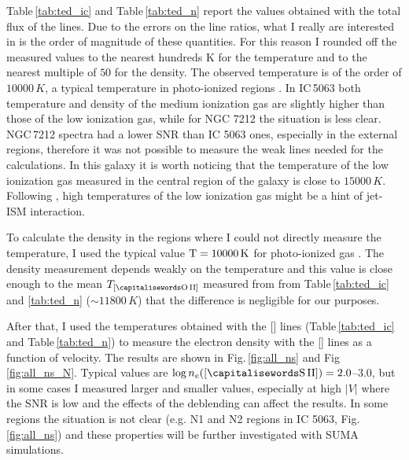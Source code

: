\documentclass[../main.tex]{subfiles}
\begin{document}
Table\,\ref{tab:ted_ic} and Table\,\ref{tab:ted_n} report the values obtained with the total flux of the lines.
Due to the errors on the line ratios, what I really are interested in is the order of magnitude of these quantities.
For this reason I rounded off the measured values to the nearest hundreds K for the temperature and to the nearest multiple of $50$ for the density.
The observed temperature is of the order of $10000\,\si{K}$, a typical temperature in photo-ionized regions \citep{OsterbrockAGN}.
In IC\,5063 both temperature and density of the medium ionization gas are slightly higher than those of the low ionization gas, while for NGC 7212 the situation is less clear.
NGC\,7212 spectra had a lower SNR than IC 5063 ones, especially in the external regions, therefore it was not possible to measure the weak lines needed for the calculations.
In this galaxy it is worth noticing that the temperature of the low ionization gas measured in the central region of the galaxy is close to $15000\,\si{K}$. 
Following \citet{Roche16}, high temperatures of the low ionization gas might be a hint of jet-ISM interaction.

To calculate the density in the regions where I could not directly measure the temperature, I used the typical value $\rm{T} = 10000\,\si{K}$ for photo-ionized gas \citep{OsterbrockAGN}. 
The density measurement depends weakly on the temperature \citep{OsterbrockAGN} and this value is close enough to the mean $T_{[\rm \ion{O}{II}]}$ measured from from Table\,\ref{tab:ted_ic} and \ref{tab:ted_n} ($\sim 11800\,\si{K}$) that the difference is negligible for our purposes.

After that, I used the temperatures obtained with the [] lines (Table\,\ref{tab:ted_ic} and Table\,\ref{tab:ted_n}) to measure the electron density with the [] lines as a function of velocity.
The results are shown in Fig.\,\ref{fig:all_ns} and Fig\,\ref{fig:all_ns_N}.
Typical values are $\log n_e([\rm\ion{S}{II}]) = 2.0$--$3.0$, but in some cases I measured larger and smaller values, especially at high $\lvert V \rvert$ where the SNR is low and the effects of the deblending can affect the results.
In some regions the situation is not clear (e.g. N1 and N2 regions in IC 5063, Fig.\,\ref{fig:all_ns}) and these properties will be further investigated with SUMA simulations.
\end{document}
